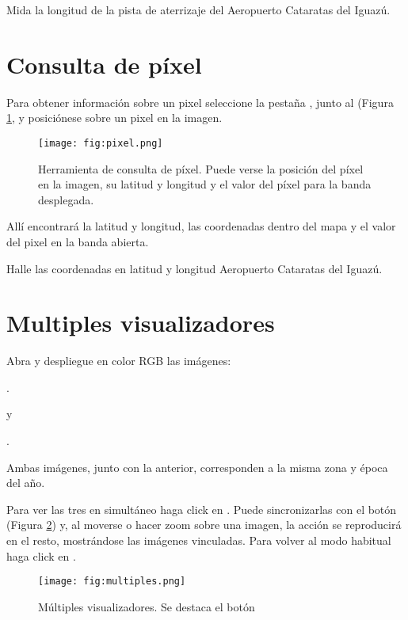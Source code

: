 Mida la longitud de la pista de aterrizaje del Aeropuerto Cataratas del Iguazú.

\section{Consulta de píxel}

Para obtener información sobre un pixel seleccione la pestaña , junto al  (Figura \ref{fig:pixel}, y posiciónese sobre un pixel en la imagen.

\begin{figure}[h!]
    \centering
    \texttt{[image: fig:pixel.png]}
    \caption{Herramienta de consulta de píxel. Puede verse la posición del píxel en la imagen, su latitud y longitud y el valor del píxel para la banda desplegada.}
    \label{fig:pixel}
\end{figure}

Allí encontrará la latitud y longitud, las coordenadas dentro del mapa y el valor del pixel en la banda abierta.

Halle las coordenadas en latitud y longitud Aeropuerto Cataratas del Iguazú.

\section{Multiples visualizadores}

Abra  y despliegue en color RGB las imágenes:
\begin{center} .
\end{center}
y
\begin{center} .
\end{center}

Ambas imágenes, junto con la anterior, corresponden a la misma zona y época del año.

Para ver las tres en simultáneo haga click en . Puede sincronizarlas con el botón  (Figura \ref{fig:multiples}) y, al moverse o hacer zoom sobre una imagen, la acción se reproducirá en el resto, mostrándose las imágenes vinculadas. Para volver al modo habitual haga click en . 

\begin{figure}[h!]
    \centering
    \texttt{[image: fig:multiples.png]}
    \caption{Múltiples visualizadores. Se destaca el botón \\ }
    \label{fig:multiples}
\end{figure}

